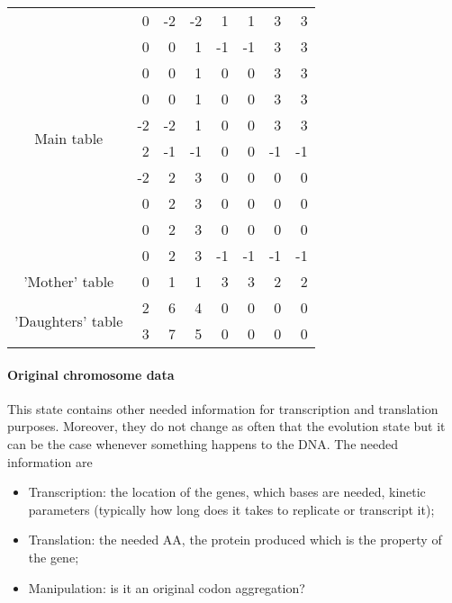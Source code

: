 \begin{center}
  \begin{tabular}{|c|r|r|r|r|r|r|r|}
     \hline
     \multirow{10}{*}{Main table} & 0 & -2 & -2 &  1 &  1 & 3 & 3 \\
     &  0 &  0 &  1 & -1 & -1 &  3 &  3 \\
     &  0 &  0 &  1 &  0 &  0 &  3 &  3 \\
     &  0 &  0 &  1 &  0 &  0 &  3 &  3 \\
     & -2 & -2 &  1 &  0 &  0 &  3 &  3 \\
     &  2 & -1 & -1 &  0 &  0 & -1 & -1 \\
     & -2 &  2 &  3 &  0 &  0 &  0 &  0 \\
     &  0 &  2 &  3 &  0 &  0 &  0 &  0 \\
     &  0 &  2 &  3 &  0 &  0 &  0 &  0 \\
     &  0 &  2 &  3 & -1 & -1 & -1 & -1 \\
     \hline \hline
     'Mother' table & 0 & 1 & 1 & 3 & 3 & 2 & 2 \\
     \hline \hline
     \multirow{2}{*}{'Daughters' table} & 2 & 6 & 4 & 0 & 0 & 0 & 0 \\
     & 3 & 7 & 5 & 0 & 0 & 0 & 0 \\
     \hline
   \end{tabular}
\end{center}


\paragraph{Original chromosome data} This state contains other needed information for transcription and translation purposes. Moreover, they do not change as often that the evolution state but it can be the case whenever something happens to the DNA. The needed information are
\begin{itemize}
  \item Transcription: the location of the genes, which bases are needed, \textcolor[rgb]{1.00,0.00,0.00}{kinetic parameters (typically how long does it takes to replicate or transcript it)};
  \item Translation: the needed AA, \textcolor[rgb]{1.00,0.00,0.00}{the protein produced which is the property of the gene};
  \item \textcolor[rgb]{1.00,0.00,0.00}{Manipulation: is it an original codon aggregation?}
\end{itemize}

